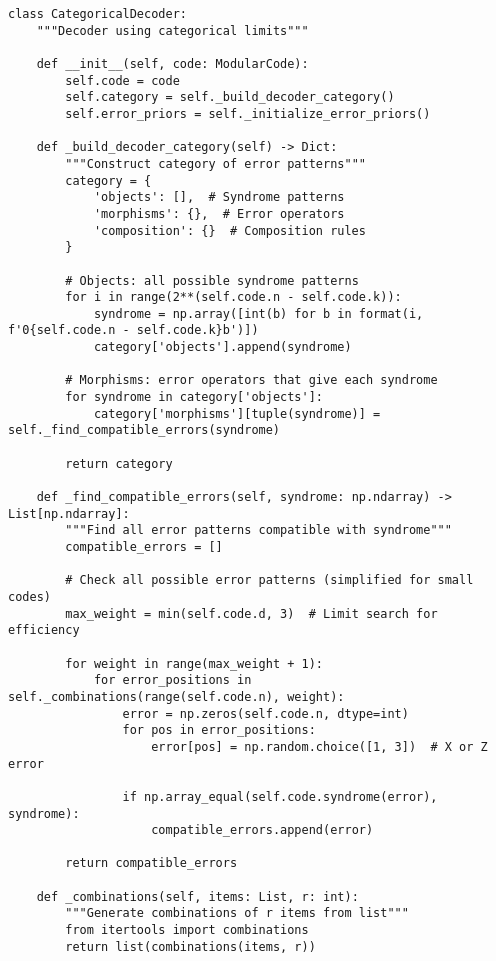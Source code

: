 \documentclass[12pt,a4paper]{article}
\begin{document}
\begin{lstlisting}[style=python,caption=Categorical decoder using limits]
class CategoricalDecoder:
    """Decoder using categorical limits"""
    
    def __init__(self, code: ModularCode):
        self.code = code
        self.category = self._build_decoder_category()
        self.error_priors = self._initialize_error_priors()
    
    def _build_decoder_category(self) -> Dict:
        """Construct category of error patterns"""
        category = {
            'objects': [],  # Syndrome patterns
            'morphisms': {},  # Error operators
            'composition': {}  # Composition rules
        }
        
        # Objects: all possible syndrome patterns
        for i in range(2**(self.code.n - self.code.k)):
            syndrome = np.array([int(b) for b in format(i, f'0{self.code.n - self.code.k}b')])
            category['objects'].append(syndrome)
        
        # Morphisms: error operators that give each syndrome
        for syndrome in category['objects']:
            category['morphisms'][tuple(syndrome)] = self._find_compatible_errors(syndrome)
        
        return category
    
    def _find_compatible_errors(self, syndrome: np.ndarray) -> List[np.ndarray]:
        """Find all error patterns compatible with syndrome"""
        compatible_errors = []
        
        # Check all possible error patterns (simplified for small codes)
        max_weight = min(self.code.d, 3)  # Limit search for efficiency
        
        for weight in range(max_weight + 1):
            for error_positions in self._combinations(range(self.code.n), weight):
                error = np.zeros(self.code.n, dtype=int)
                for pos in error_positions:
                    error[pos] = np.random.choice([1, 3])  # X or Z error
                
                if np.array_equal(self.code.syndrome(error), syndrome):
                    compatible_errors.append(error)
        
        return compatible_errors
    
    def _combinations(self, items: List, r: int):
        """Generate combinations of r items from list"""
        from itertools import combinations
        return list(combinations(items, r))
    

\end{lstlisting}
\end{document}
